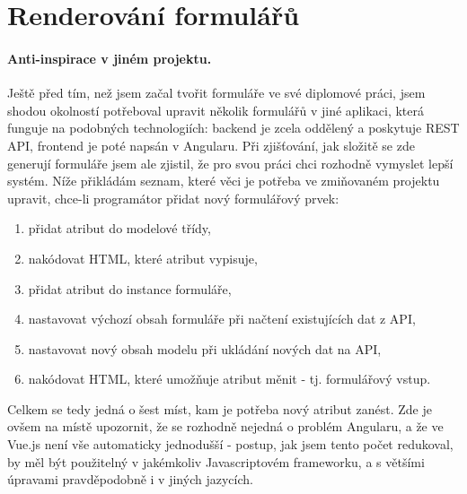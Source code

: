 
\section{Renderování formulářů} \label{implementation:formRender}

\paragraph{Anti-inspirace v jiném projektu.} Ještě před tím, než jsem začal tvořit formuláře ve své diplomové práci, jsem shodou okolností potřeboval upravit několik formulářů v jiné aplikaci, která funguje na podobných technologiích: backend je zcela oddělený a poskytuje REST API, frontend je poté napsán v Angularu. Při zjišťování, jak složitě se zde generují formuláře jsem ale zjistil, že pro svou práci chci rozhodně vymyslet lepší systém. Níže přikládám seznam, které věci je potřeba ve zmiňovaném projektu upravit, chce-li programátor přidat nový formulářový prvek:

\begin{enumerate}
    \item přidat atribut do modelové třídy,
    \item nakódovat HTML, které atribut vypisuje,
    \item přidat atribut do instance formuláře,
    \item nastavovat výchozí obsah formuláře při načtení existujících dat z API,
    \item nastavovat nový obsah modelu při ukládání nových dat na API,
    \item nakódovat HTML, které umožňuje atribut měnit - tj. formulářový vstup.
\end{enumerate}

Celkem se tedy jedná o šest míst, kam je potřeba nový atribut zanést. Zde je ovšem na místě upozornit, že se rozhodně nejedná o problém Angularu, a že ve Vue.js není vše automaticky jednodušší - postup, jak jsem tento počet redukoval, by měl být použitelný v jakémkoliv Javascriptovém frameworku, a s většími úpravami pravděpodobně i v jiných jazycích.\\

